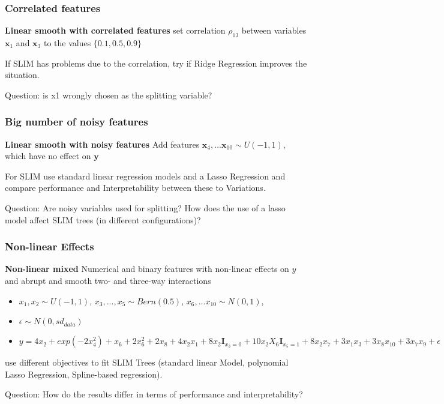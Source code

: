 \color{black}


\subsubsection{Correlated features}
\textbf{Linear smooth with correlated features} set correlation $\rho_{13}$ between  variables $\textbf{x}_1$ and $\textbf{x}_3$ to the values $\{0.1, 0.5, 0.9\}$

If SLIM has problems due to the correlation, try if Ridge Regression improves the situation.

Question: is x1 wrongly chosen as the splitting variable?

\subsubsection{Big number of noisy features}
\textbf{Linear smooth with noisy features}
Add features $\textbf{x}_{4}, ... \textbf{x}_{10} \sim U(-1,1)$, which have no effect on $\textbf{y}$

For SLIM use standard linear regression models and a Lasso Regression and compare performance and Interpretability between these to Variations.

Question: Are noisy variables used for splitting? How does the use of a lasso model affect SLIM trees (in different configurations)?

\subsubsection{Non-linear Effects}
\textbf{Non-linear mixed}
Numerical and binary features with non-linear effects on $y$ and abrupt and smooth two- and three-way interactions
\begin{itemize}
    \item $x_1, x_2 \sim U(-1,1)$, $x_3, ..., x_5 \sim Bern(0.5)$, $x_6, ... x_{10} \sim N(0,1)$,  \item $\epsilon \sim N(0, sd_{data})$
    \item $y = 4   x_2 + exp(-2 x_4^2) + x_6 + 2 x_6^2 + 2   x_8 + 4   x_2   x_1 + 8   x_2   \mathbf{I}_{x_3 = 0} + 10   x_2   X_6    \mathbf{I}_{x_5 = 1} + 8   x_2   x_7 + 3   x_1   x_3 + 3   x_8   x_{10} + 3   x_7   x_9  + \epsilon$
\end{itemize}
use different objectives to fit SLIM Trees (standard linear Model, polynomial Lasso Regression, Spline-based regression).

Question: How do the results differ in terms of performance and interpretability?


